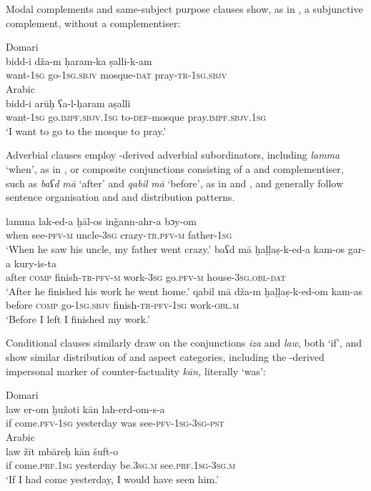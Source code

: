 \documentclass[output=paper]{langsci/langscibook}
\begin{document}
Modal complements and same-subject purpose clauses show, as in , a subjunctive complement, without a complementiser:

\ea
\ea
{Domari}\\
\gll bidd-i  dža-m  ḥaram-ka ṣalli-k-am  \\
       want-\textsc{1sg} go-\textsc{1sg.sbjv} mosque-\textsc{dat} pray-\textsc{tr-1sg.sbjv}\\
\ex
{Arabic}\\
\gll bidd-i  arūḥ ʕa-l-ḥaram aṣalli  \\
       want-\textsc{1sg} go.\textsc{impf.sbjv.1sg} to-\textsc{def-}mosque pray.\textsc{impf.sbjv.1sg} \\
\glt    ‘I want to go to the mosque to pray.’
\z
\z

Adverbial clauses employ -derived adverbial subordinators, including \textit{lamma} ‘when’, as in , or composite conjunctions consisting of a  and complementiser, such as \textit{baʕd} \textit{mā} ‘after’ and \textit{qabil} \textit{mā} ‘before’, as in  and , and generally follow  sentence organisation and  and  distribution patterns.

\ea\label{lamma} \gll lamma lak-ed-a ḫāl-os inǧann-ahr-a bɔy-om\\
       when see-\textsc{pfv-m} uncle-\textsc{3sg} crazy-\textsc{tr.pfv-m} father-\textsc{1sg}\\
\glt     ‘When he saw his uncle, my father went crazy.’
\ex\label{after} \gll baʕd mā ḫaḷḷaṣ-k-ed-a kam-os gar-a kury-is-ta\\
     after \textsc{comp} finish-\textsc{tr-pfv-m} work-\textsc{3sg} go.\textsc{pfv-m} house-\textsc{3sg.obl-dat}\\
\glt     ‘After he finished his work he went home.’
\ex\label{before} \gll qabil mā dža-m ḫaḷḷaṣ-k-ed-om kam-as\\
       before  \textsc{comp} go-\textsc{1sg.sbjv} finish-\textsc{tr-pfv-1sg} work-\textsc{obl.m}\\
\glt     ‘Before I left I finished my work.’
\z

Conditional clauses similarly draw on the  conjunctions \textit{iza} and \textit{law}, both ‘if’, and show similar distribution of  and aspect categories, including the -derived impersonal marker of counter-factuality \textit{kān,} literally ‘was’:

\ea
\ea
{Domari}\\
\gll law er-om ḫužoti kān lah-erd-om-s-a \\
       if come.\textsc{pfv-1sg} yesterday was see-\textsc{pfv-1sg-3sg-pst}\\
\ex
{Arabic}\\
\gll law žīt mbāreḥ kān šuft-o  \\
       if come.\textsc{prf.1sg} yesterday be.\textsc{3sg.m} see.\textsc{prf.1sg-3sg.m}\\
\glt   ‘If I had come yesterday, I would have seen him.’
\z
\z
\end{document}

